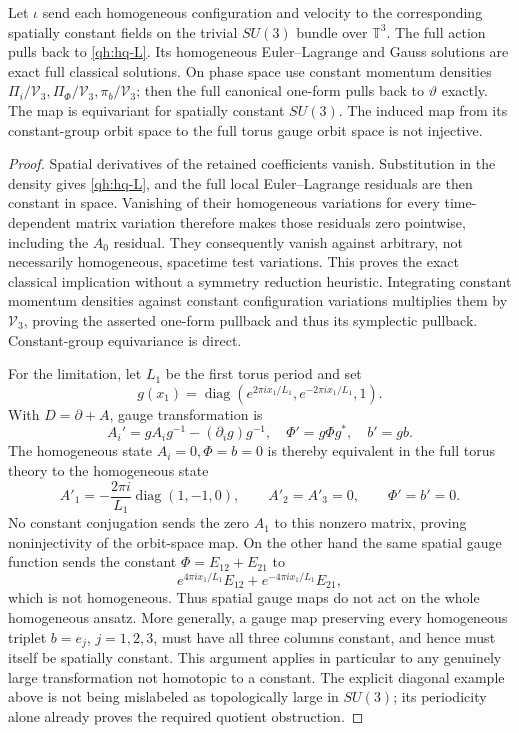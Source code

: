 \begin{proposition}
\label{qh:hq-embedding}
Let \(\iota\) send each homogeneous configuration and velocity to
the corresponding spatially constant fields on the trivial
\(SU(3)\) bundle over \(\mathbb T^3\).
The full action pulls back to \eqref{qh:hq-L}. Its homogeneous
Euler--Lagrange and Gauss solutions are exact full classical solutions.
On phase space use constant momentum densities
\(\Pi_i/\mathcal V_3,\Pi_\Phi/\mathcal V_3,\pi_b/\mathcal V_3\);
then the full canonical one-form pulls back to \(\vartheta\)
exactly. The map is equivariant for spatially constant \(SU(3)\).
The induced map from its constant-group orbit space to the full
torus gauge orbit space is not injective.
\end{proposition}
\begin{proof}
Spatial derivatives of the retained coefficients vanish. Substitution
in the density gives \eqref{qh:hq-L}, and the full local
Euler--Lagrange residuals are then constant in space.
Vanishing of their homogeneous variations for every time-dependent
matrix variation therefore makes those residuals zero pointwise,
including the \(A_0\) residual. They consequently vanish against
arbitrary, not necessarily homogeneous, spacetime test variations.
This proves the exact classical implication without a symmetry
reduction heuristic. Integrating constant momentum densities against
constant configuration variations multiplies them by \(\mathcal V_3\),
proving the asserted one-form pullback and thus its symplectic
pullback. Constant-group equivariance is direct.

For the limitation, let \(L_1\) be the first torus period and set
\[
 g(x_1)=\operatorname{diag}
   (e^{2\pi ix_1/L_1},e^{-2\pi ix_1/L_1},1).
\]
With \(D=\partial+A\), gauge transformation is
\[
 A_i'=gA_ig^{-1}-(\partial_i g)g^{-1},\quad
 \Phi'=g\Phi g^*,\quad b'=gb.
\]
The homogeneous state \(A_i=0,\Phi=b=0\) is thereby equivalent in
the full torus theory to the homogeneous state
\[
 A'_1=-\frac{2\pi i}{L_1}\operatorname{diag}(1,-1,0),\qquad
 A'_2=A'_3=0,\qquad \Phi'=b'=0 .
\]
No constant conjugation sends the zero \(A_1\) to this nonzero
matrix, proving noninjectivity of the orbit-space map.
On the other hand the same spatial gauge function sends the constant
\(\Phi=E_{12}+E_{21}\) to
\[
 e^{4\pi ix_1/L_1}E_{12}+e^{-4\pi ix_1/L_1}E_{21},
\]
which is not homogeneous. Thus spatial gauge maps do not act on
the whole homogeneous ansatz. More generally, a gauge map preserving
every homogeneous triplet \(b=e_j\), \(j=1,2,3\), must have all
three columns constant, and hence must itself be spatially constant.
This argument applies in particular to any genuinely large
transformation not homotopic to a constant. The explicit diagonal
example above is not being mislabeled as topologically large in
\(SU(3)\); its periodicity alone already proves the required
quotient obstruction.
\end{proof}

